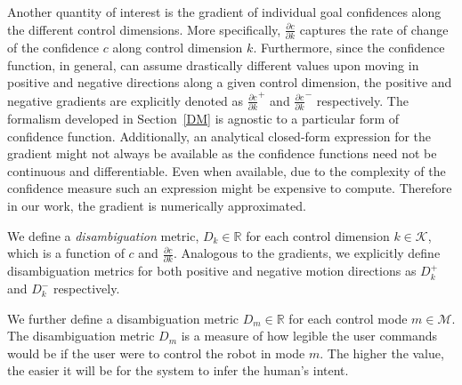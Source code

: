 \documentclass[conference]{IEEEtran}
\begin{document}
Another quantity of interest is the gradient of individual goal confidences along the different control dimensions. More specifically, $\frac{\partial c}{\partial k}$ captures the rate of change of the confidence $c$ along control dimension $k$. Furthermore, since the confidence function, in general, can assume drastically different values upon moving in positive and negative directions along a  given control dimension, the positive and negative gradients are explicitly denoted as $\frac{\partial c}{\partial k}^{+}$ and $\frac{\partial c}{\partial k}^{-}$ respectively. The formalism developed in Section~\ref{DM} is agnostic to a particular form of confidence function. Additionally, an analytical closed-form expression for the gradient might not always be available as the confidence functions need not be continuous and differentiable. Even when available, due to the complexity of the confidence measure such an expression might be expensive to compute. Therefore in our work, the gradient is numerically approximated.

We define a \textit{disambiguation} metric, $D_{k}\in \mathbb{R}$ for each control dimension $k \in \mathcal{K}$, which is a function of $c$ and $\frac{\partial c}{\partial k}$. Analogous to the gradients, we explicitly define disambiguation metrics for both positive and negative motion directions as $D_{k}^{+}$ and $D_{k}^{-}$ respectively.

We further define a disambiguation metric $D_m \in \mathbb{R}$ for each control mode $m \in \mathcal{M}$.
The disambiguation metric $D_m$ is a measure of how legible the user commands would be if the user were to control the robot in mode $m$. The higher the value, the easier it will be for the system to infer the human's intent. 
\end{document}
